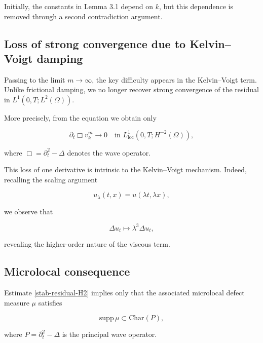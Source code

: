 \documentclass[11pt,letterpaper]{amsart}
\begin{document}
Initially, the constants in Lemma 3.1 depend on $k$, but this dependence
is removed through a second contradiction argument.


\subsection{Loss of strong convergence due to Kelvin--Voigt damping}

Passing to the limit $m \to \infty$, the key difficulty appears in the
Kelvin--Voigt term. Unlike frictional damping, we no longer recover
strong convergence of the residual in $L^1(0,T;L^2(\Omega))$.

More precisely, from the equation we obtain only

\begin{equation}
\partial_t \Box v_k^m \longrightarrow 0
\quad \text{in } L^1_{\mathrm{loc}}(0,T;H^{-2}(\Omega)),
\label{stab-residual-H2}
\end{equation}

where $\Box = \partial_t^2 - \Delta$ denotes the wave operator.

This loss of one derivative is intrinsic to the Kelvin--Voigt mechanism.
Indeed, recalling the scaling argument

\[
u_\lambda(t,x) = u(\lambda t, \lambda x),
\]

we observe that

\[
\Delta u_t \mapsto \lambda^3 \Delta u_t,
\]

revealing the higher-order nature of the viscous term.

\subsection{Microlocal consequence}

Estimate \eqref{stab-residual-H2} implies only that the associated
microlocal defect measure $\mu$ satisfies

\begin{equation}
\mathrm{supp}\,\mu \subset \mathrm{Char}(P),
\label{stab-char}
\end{equation}

where $P = \partial_t^2 - \Delta$ is the principal wave operator.
\end{document}
